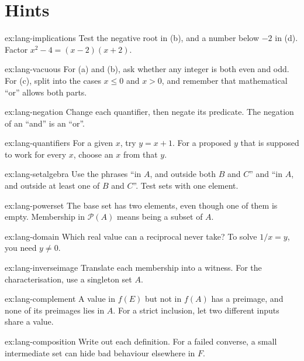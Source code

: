 \section{Hints}

\begin{hint}{ex:lang-implications}
Test the negative root in (b), and a number below $-2$ in (d). Factor $x^2-4=(x-2)(x+2)$.
\end{hint}
\begin{hint}{ex:lang-vacuous}
For (a) and (b), ask whether any integer is both even and odd. For (c), split into the cases $x\le 0$ and $x>0$, and remember that mathematical ``or'' allows both parts.
\end{hint}
\begin{hint}{ex:lang-negation}
Change each quantifier, then negate its predicate. The negation of an ``and'' is an ``or''.
\end{hint}
\begin{hint}{ex:lang-quantifiers}
For a given $x$, try $y=x+1$. For a proposed $y$ that is supposed to work for every $x$, choose an $x$ from that $y$.
\end{hint}
\begin{hint}{ex:lang-setalgebra}
Use the phrases ``in $A$, and outside both $B$ and $C$'' and ``in $A$, and outside at least one of $B$ and $C$''. Test sets with one element.
\end{hint}
\begin{hint}{ex:lang-powerset}
The base set has two elements, even though one of them is empty. Membership in $\mathcal P(A)$ means being a subset of $A$.
\end{hint}
\begin{hint}{ex:lang-domain}
Which real value can a reciprocal never take? To solve $1/x=y$, you need $y\ne 0$.
\end{hint}
\begin{hint}{ex:lang-inverseimage}
Translate each membership into a witness. For the characterisation, use a singleton set $A$.
\end{hint}
\begin{hint}{ex:lang-complement}
A value in $f(E)$ but not in $f(A)$ has a preimage, and none of its preimages lies in $A$. For a strict inclusion, let two different inputs share a value.
\end{hint}
\begin{hint}{ex:lang-composition}
Write out each definition. For a failed converse, a small intermediate set can hide bad behaviour elsewhere in $F$.
\end{hint}
